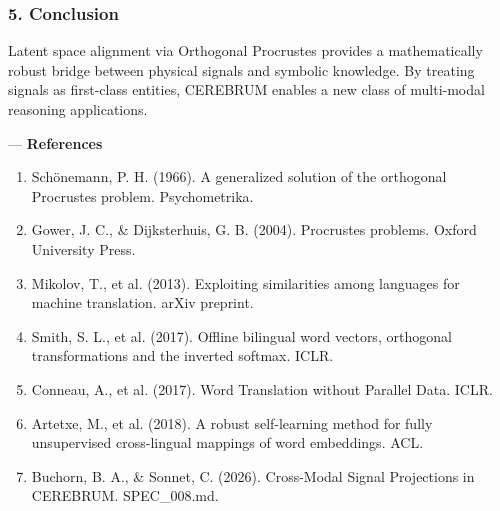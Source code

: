 \subsubsection{5. Conclusion}
Latent space alignment via Orthogonal Procrustes provides a mathe\-matically robust bridge between physical signals and symbolic knowledge. By treating signals as first-class entities, CEREBRUM enables a new class of multi-modal reasoning appli\-cations.

---
\textbf{References}
\begin{enumerate}
\item Schönemann, P. H. (1966). A generalized solution of the orthogonal Procrustes problem. Psycho\-metrika.
\item Gower, J. C., \& Dijkst\-erhuis, G. B. (2004). Procrustes problems. Oxford University Press.
\item Mikolov, T., et al. (2013). Exploiting simil\-arities among languages for machine translation. arXiv preprint.
\item Smith, S. L., et al. (2017). Offline bilingual word vectors, orthogonal trans\-formations and the inverted softmax. ICLR.
\item Conneau, A., et al. (2017). Word Translation without Parallel Data. ICLR.
\item Artetxe, M., et al. (2018). A robust self-learning method for fully unsup\-ervised cross-lingual mappings of word embeddings. ACL.
\item Buchorn, B. A., \& Sonnet, C. (2026). Cross-Modal Signal Projections in CEREBRUM. SPEC\_008.md.

\end{enumerate}